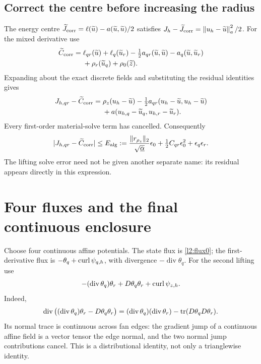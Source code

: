 \subsection{Correct the centre before increasing the radius}
The energy centre
$\widetilde J_{\rm corr}=\ell(\widetilde u)-a(\widetilde u,\widetilde u)/2$
satisfies $J_h-\widetilde J_{\rm corr}=\left\|u_h-\widetilde u\right\|_a^2/2$.
For the mixed derivative use
\begin{align*}
 \widetilde C_{\rm corr}={}&\ell_{qr}(\widetilde u)
 +\ell_q(\widetilde u_r)-\tfrac12a_{qr}(\widetilde u,\widetilde u)
 -a_q(\widetilde u,\widetilde u_r)\\
 &+\rho_r(\widetilde u_q)+\rho_0(\widetilde z).
\end{align*}
Expanding about the exact discrete fields and substituting the residual
identities gives
\begin{align*}
 J_{h,qr}-\widetilde C_{\rm corr}
 ={}&\rho_z(u_h-\widetilde u)
 -\tfrac12a_{qr}(u_h-\widetilde u,u_h-\widetilde u)\\
 &+a(u_{h,q}-\widetilde u_q,u_{h,r}-\widetilde u_r).
\end{align*}
Every first-order material-solve term has cancelled. Consequently
\[
 |J_{h,qr}-\widetilde C_{\rm corr}|\leq E_{\rm alg}
 :=\frac{\|r_{\rho_z}\|_2}{\sqrt{\underline\alpha}}\epsilon_0
   +\tfrac12C_{qr}\epsilon_0^2+\epsilon_q\epsilon_r.
\]
The lifting solve error need not be given another separate name: its
residual appears directly in this expression.

\section{Four fluxes and the final continuous enclosure}
\label{l2:assembly}
Choose four continuous affine potentials. The state flux is
\eqref{l2:flux0}; the first-derivative flux is
$-\theta_q+\operatorname{curl}\psi_{q,h}$, with divergence $-\operatorname{div}\theta_q$.
For the second lifting use
\[
 -(\operatorname{div}\theta_q)\theta_r+D\theta_q\theta_r
                                  +\operatorname{curl}\psi_{z,h}.
\]
Indeed,
\[
 \operatorname{div}\big((\operatorname{div}\theta_q)\theta_r
                 -D\theta_q\theta_r\big)
 =(\operatorname{div}\theta_q)(\operatorname{div}\theta_r)
                       -\operatorname{tr}(D\theta_qD\theta_r).
\]
Its normal trace is continuous across fan edges: the gradient jump of a
continuous affine field is a vector tensor the edge normal, and the two
normal jump contributions cancel. This is a distributional identity,
not only a trianglewise identity.

